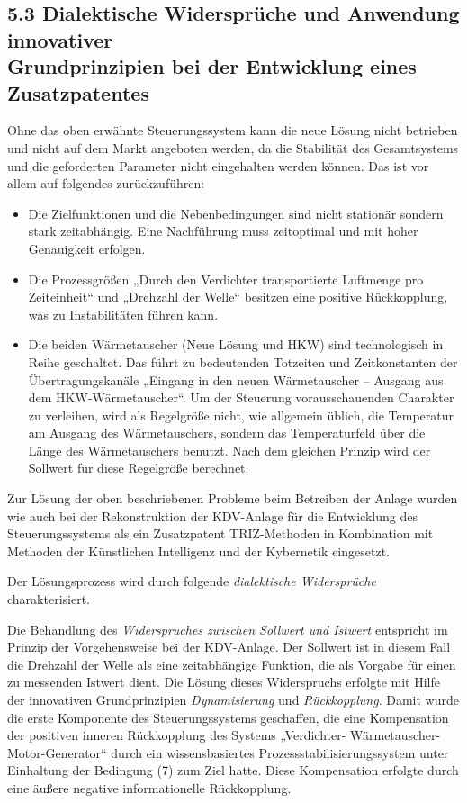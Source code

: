 \documentclass[11pt,a4paper]{article}
\begin{document}
\subsection*{5.3 Dialektische Widersprüche und Anwendung innovativer\\
  Grundprinzipien bei der Entwicklung eines Zusatzpatentes} 

Ohne das oben erwähnte Steuerungssystem kann die neue Lösung nicht betrieben
und nicht auf dem Markt angeboten werden, da die Stabilität des Gesamtsystems
und die geforderten Parameter nicht eingehalten werden können. Das ist vor
allem auf folgendes zurückzuführen:
\begin{itemize}
\item Die Zielfunktionen und die Nebenbedingungen sind nicht stationär sondern
  stark zeitabhängig. Eine Nachführung muss zeitoptimal und mit hoher
  Genauigkeit erfolgen. 
\item	Die Prozessgrößen „Durch den Verdichter transportierte Luftmenge pro
  Zeiteinheit“ und „Drehzahl der Welle“ besitzen eine positive Rückkopplung,
  was zu Instabilitäten führen kann. 
\item	Die beiden Wärmetauscher (Neue Lösung und HKW) sind technologisch in
  Reihe geschaltet. Das führt zu bedeutenden Totzeiten und Zeitkonstanten der
  Übertragungskanäle „Eingang in den neuen Wärmetauscher – Ausgang aus dem
  HKW-Wärmetauscher“. Um der Steuerung vorausschauenden Charakter zu verleihen,
  wird als Regelgröße nicht, wie allgemein üblich, die Temperatur am Ausgang
  des Wärmetauschers, sondern das Temperaturfeld über die Länge des
  Wärmetauschers benutzt. Nach dem gleichen Prinzip wird der Sollwert für diese
  Regelgröße berechnet.
\end{itemize}
Zur Lösung der oben beschriebenen Probleme beim Betreiben der Anlage wurden wie
auch bei der Rekonstruktion der KDV-Anlage für die Entwicklung des
Steuerungssystems als ein Zusatzpatent TRIZ-Methoden in Kombination mit
Methoden der Künstlichen Intelligenz und der Kybernetik eingesetzt.

Der Lösungsprozess wird durch  folgende \emph{dialektische Widersprüche}
charakterisiert.

Die Behandlung des \emph{Widerspruches zwischen Sollwert und Istwert}
entspricht im Prinzip der Vorgehensweise bei der KDV-Anlage.  Der Sollwert ist
in diesem Fall die Drehzahl der Welle als eine zeitabhängige Funktion, die als
Vorgabe für einen zu messenden Istwert dient.  Die Lösung dieses Widerspruchs
erfolgte mit Hilfe der innovativen Grundprinzipien \emph{Dynamisierung} und
\emph{Rückkopplung}. Damit wurde die erste Komponente des Steuerungssystems
geschaffen, die eine Kompensation der positiven inneren Rückkopplung des
Systems „Verdichter- Wärmetauscher-Motor-Generator“ durch ein wissensbasiertes
Prozessstabilisierungssystem unter Einhaltung der Bedingung (7) zum Ziel
hatte. Diese Kompensation erfolgte durch eine äußere negative informationelle
Rückkopplung.
\end{document}
